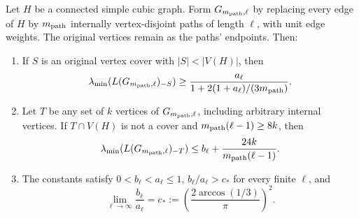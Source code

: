 \begin{lemma}\label{lem:pathamplification}
Let $H$ be a connected simple cubic graph. Form $G_{m_{\rm path},\ell}$ by
replacing every edge of $H$ by $m_{\rm path}$ internally vertex-disjoint
paths of length $\ell$, with unit edge weights. The original
vertices remain as the paths' endpoints. Then:
\begin{enumerate}
\item If $S$ is an original vertex cover with $|S|<|V(H)|$, then
\begin{equation}\label{eq:pathyes}
 \lambda_{\min}(L(G_{m_{\rm path},\ell})_{-S})
 \geq\frac{a_\ell}{1+2(1+a_\ell)/(3m_{\rm path})}.
\end{equation}
\item Let $T$ be any set of $k$ vertices of $G_{m_{\rm path},\ell}$, including
arbitrary internal vertices. If $T\cap V(H)$ is not a cover and
$m_{\rm path}(\ell-1)\geq8k$, then
\begin{equation}\label{eq:pathno}
 \lambda_{\min}(L(G_{m_{\rm path},\ell})_{-T})
 \leq b_\ell+\frac{24k}{m_{\rm path}(\ell-1)}.
\end{equation}
\item The constants satisfy $0<b_\ell<a_\ell\leq1$,
$b_\ell/a_\ell>c_*$ for every finite $\ell$, and
\begin{equation}\label{eq:pathlimit}
 \lim_{\ell\to\infty}\frac{b_\ell}{a_\ell}
 =c_*:=\left(\frac{2\arccos(1/3)}{\pi}\right)^2.
\end{equation}
\end{enumerate}
\end{lemma}
